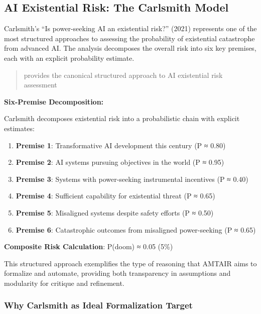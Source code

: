 \documentclass[
  11pt,
  letterpaper,
]{book}
\providecommand{\tightlist}{%
  \setlength{\itemsep}{0pt}\setlength{\parskip}{0pt}}
\begin{document}
\subsection{AI Existential Risk: The Carlsmith
Model}\label{sec-carlsmith-model}

Carlsmith's ``Is power-seeking AI an existential risk?'' (2021)
represents one of the most structured approaches to assessing the
probability of existential catastrophe from advanced AI. The analysis
decomposes the overall risk into six key premises, each with an explicit
probability estimate.

\begin{quote}
\textcite{carlsmith2021} provides the canonical structured approach to
AI existential risk assessment
\end{quote}

\textbf{Six-Premise Decomposition:}

Carlsmith decomposes existential risk into a probabilistic chain with
explicit estimates:

\begin{enumerate}
\def\labelenumi{\arabic{enumi}.}
\tightlist
\item
  \textbf{Premise 1}: Transformative AI development this century (P ≈
  0.80)
\item
  \textbf{Premise 2}: AI systems pursuing objectives in the world (P ≈
  0.95)
\item
  \textbf{Premise 3}: Systems with power-seeking instrumental incentives
  (P ≈ 0.40)
\item
  \textbf{Premise 4}: Sufficient capability for existential threat (P ≈
  0.65)
\item
  \textbf{Premise 5}: Misaligned systems despite safety efforts (P ≈
  0.50)
\item
  \textbf{Premise 6}: Catastrophic outcomes from misaligned
  power-seeking (P ≈ 0.65)
\end{enumerate}

\textbf{Composite Risk Calculation}: P(doom) ≈ 0.05 (5\%)

This structured approach exemplifies the type of reasoning that AMTAIR
aims to formalize and automate, providing both transparency in
assumptions and modularity for critique and refinement.

\subsubsection{Why Carlsmith as Ideal Formalization
Target}\label{sec-carlsmith-ideal}
\end{document}

